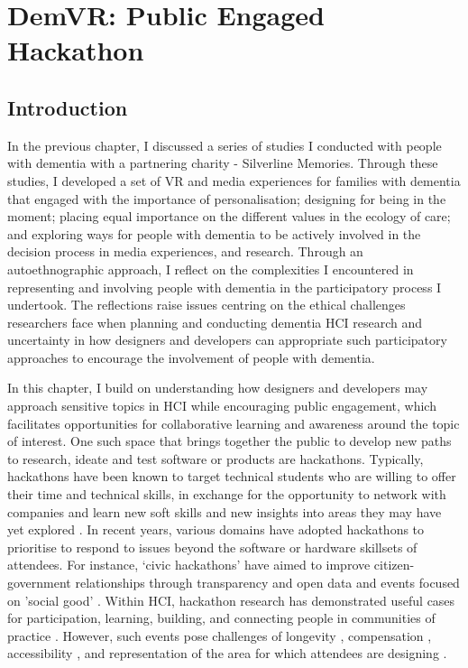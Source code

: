 \chapter{DemVR: Public Engaged Hackathon}
\label{DemVR}

\section{Introduction}
\label{sec:DemVRIntroduction}
In the previous chapter, I discussed a series of studies I conducted with people with dementia with a partnering charity - Silverline Memories. Through these studies, I developed a set of VR and media experiences for families with dementia that engaged with the importance of personalisation; designing for being in the moment; placing equal importance on the different values in the ecology of care; and exploring ways for people with dementia to be actively involved in the decision process in media experiences, and research. Through an autoethnographic approach, I reflect on the complexities I encountered in representing and involving people with dementia in the participatory process I undertook. The reflections raise issues centring on the ethical challenges researchers face when planning and conducting dementia HCI research and uncertainty in how designers and developers can appropriate such participatory approaches to encourage the involvement of people with dementia.

In this chapter, I build on understanding how designers and developers may approach sensitive topics in HCI while encouraging public engagement, which facilitates opportunities for collaborative learning and awareness around the topic of interest. One such space that brings together the public to develop new paths to research, ideate and test software or products are hackathons. Typically, hackathons have been known to target technical students who are willing to offer their time and technical skills, in exchange for the opportunity to network with companies and learn new soft skills and new insights into areas they may have yet explored \citep{olesen_what_2021}. In recent years, various domains have adopted hackathons to prioritise to respond to issues beyond the software or hardware skillsets of attendees. For instance, ‘civic hackathons’ \citep{johnson_civic_2014} have aimed to improve citizen-government relationships through transparency and open data and events focused on 'social good' \citep{ferrario_software_2014}. Within HCI, hackathon research has demonstrated useful cases for participation, learning, building, and connecting people in communities of practice \citep{falk_olesen_10_2020, birbeck_self_2017, hou_hacking_2017, johnson_civic_2014} . However, such events pose challenges of longevity \citep{birbeck_self_2017}, compensation \citep{endrissat_hackathons_2018}, accessibility \citep{hope_hackathons_2019}, and representation of the area for which attendees are designing \citep{toombs_hackerspace_2017}. 


